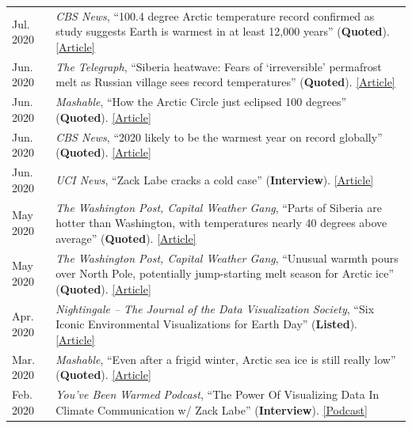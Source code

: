\documentclass[margin,line,palatino,courier,10pt]{res}
\begin{document}
\begin{resume}
\begin{tabular}{@{}p{0.9in}p{4in}}
Jul. 2020 & \textit{CBS News}, ``100.4 degree Arctic temperature record confirmed as study suggests Earth is warmest in at least 12,000 years'' (\textbf{Quoted}). \href{https://www.cbsnews.com/news/arctic-temperature-record-100-4-degrees-earth-warmest-12000-years/}{[Article]}\\
Jun. 2020 & \textit{The Telegraph}, ``Siberia heatwave: Fears of `irreversible' permafrost melt as Russian village sees record temperatures'' (\textbf{Quoted}). \href{https://www.telegraph.co.uk/news/2020/06/26/siberia-heatwave-fears-irreversible-permafrost-meltas-russian/}{[Article]}\\
Jun. 2020 & \textit{Mashable}, ``How the Arctic Circle just eclipsed 100 degrees'' (\textbf{Quoted}). \href{https://mashable.com/article/arctic-heat-100-degrees/}{[Article]}\\
Jun. 2020 & \textit{CBS News}, ``2020 likely to be the warmest year on record globally'' (\textbf{Quoted}). \href{https://www.cbsnews.com/news/warmest-year-on-record-2020-likely/}{[Article]}\\
Jun. 2020 & \textit{UCI News}, ``Zack Labe cracks a cold case'' (\textbf{Interview}). \href{https://medium.com/@UCISoPS/zack-labe-cracks-a-cold-case-6e8793248e9d}{[Article]}\\
May 2020 & \textit{The Washington Post, Capital Weather Gang}, ``Parts of Siberia are hotter than Washington, with temperatures nearly 40 degrees above average'' (\textbf{Quoted}). \href{https://www.washingtonpost.com/weather/2020/05/22/siberia-heat-wave/}{[Article]}\\
May 2020 & \textit{The Washington Post, Capital Weather Gang}, ``Unusual warmth pours over North Pole, potentially jump-starting melt season for Arctic ice'' (\textbf{Quoted}). \href{https://www.washingtonpost.com/weather/2020/05/14/arctic-temperature-spike-sea-ice/}{[Article]}\\
Apr. 2020 & \textit{Nightingale – The Journal of the Data Visualization Society}, ``Six Iconic Environmental Visualizations for Earth Day'' (\textbf{Listed}). \href{https://medium.com/nightingale/six-iconic-environmental-visualizations-for-earth-day-d7a5bdaf177b}{[Article]}\\
Mar. 2020 & \textit{Mashable}, ``Even after a frigid winter, Arctic sea ice is still really low'' (\textbf{Quoted}). \href{https://mashable.com/article/arctic-sea-ice-low-2020/}{[Article]}\\
Feb. 2020 & \textit{You’ve Been Warmed Podcast}, ``The Power Of Visualizing Data In Climate Communication w/ Zack Labe'' (\textbf{Interview}). \href{https://www.youvebeenwarmed.com/episodes/the-power-of-visualizing-data-in-climate-communication-w-zack-labe}{[Podcast]}\\

\end{tabular}
\end{resume}
\end{document}

